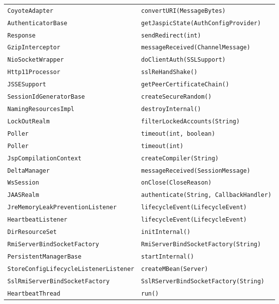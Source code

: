 \begin{center}
\begin{longtable}{ll}
\lstinline/CoyoteAdapter/&{\lstinline/convertURI(MessageBytes)/}\\
\lstinline/AuthenticatorBase/&{\lstinline/getJaspicState(AuthConfigProvider)/}\\
\lstinline/Response/&{\lstinline/sendRedirect(int)/}\\
\lstinline/GzipInterceptor/&{\lstinline/messageReceived(ChannelMessage)/}\\
\lstinline/NioSocketWrapper/&{\lstinline/doClientAuth(SSLSupport)/}\\
\lstinline/Http11Processor/&{\lstinline/sslReHandShake()/}\\
\lstinline/JSSESupport/&{\lstinline/getPeerCertificateChain()/}\\
\lstinline/SessionIdGeneratorBase/&{\lstinline/createSecureRandom()/}\\
\lstinline/NamingResourcesImpl/&{\lstinline/destroyInternal()/}\\
\lstinline/LockOutRealm/&{\lstinline/filterLockedAccounts(String)/}\\
\lstinline/Poller/&{\lstinline/timeout(int, boolean)/}\\
\lstinline/Poller/&{\lstinline/timeout(int)/}\\
\lstinline/JspCompilationContext/&{\lstinline/createCompiler(String)/}\\
\lstinline/DeltaManager/&{\lstinline/messageReceived(SessionMessage)/}\\
\lstinline/WsSession/&{\lstinline/onClose(CloseReason)/}\\
\lstinline/JAASRealm/&{\lstinline/authenticate(String, CallbackHandler)/}\\
\lstinline/JreMemoryLeakPreventionListener/&{\lstinline/lifecycleEvent(LifecycleEvent)/}\\
\lstinline/HeartbeatListener/&{\lstinline/lifecycleEvent(LifecycleEvent)/}\\
\lstinline/DirResourceSet/&{\lstinline/initInternal()/}\\
\lstinline/RmiServerBindSocketFactory/&{\lstinline/RmiServerBindSocketFactory(String)/}\\
\lstinline/PersistentManagerBase/&{\lstinline/startInternal()/}\\
\lstinline/StoreConfigLifecycleListenerListener/&{\lstinline/createMBean(Server)/}\\
\lstinline/SslRmiServerBindSocketFactory/&{\lstinline/SslRServerBindSocketFactory(String)/}\\
\lstinline/HeartbeatThread/&{\lstinline/run()/}\\

\end{longtable}
\end{center}
